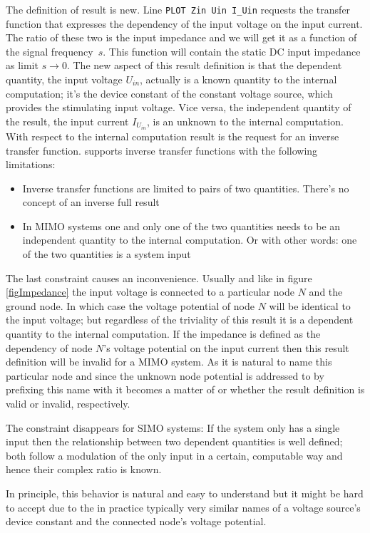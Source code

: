 The definition of result  is new. Line \verb+PLOT Zin Uin I_Uin+
requests the transfer function that expresses the dependency of the input
voltage on the input current. The ratio of these two is the input
impedance and we will get it as a function of the signal frequency~$s$. This
function will contain the static DC input impedance as limit $s \to 0$. The
new aspect of this result definition is that the dependent quantity, the
input voltage $U_{in}$, actually is a known quantity to the internal
computation; it's the device constant of the constant voltage source,
which provides the stimulating input voltage. Vice versa, the independent
quantity of the result, the input current $I_{U_{in}}$, is an unknown to the
internal computation. With respect to the internal computation result
 is the request for an inverse transfer function. \linnet{}
supports inverse transfer functions with the following limitations:
\begin{itemize}
  \item Inverse transfer functions are limited to pairs of two quantities.
    There's no concept of an inverse full result
  \item In MIMO systems one and only one of the two quantities needs to be
    an independent quantity to the internal computation. Or with other
    words: one of the two quantities is a system input
\end{itemize}
The last constraint causes an inconvenience. Usually and like in figure
\ref{figImpedance} the input voltage is connected to a particular node $N$
and the ground node. In which case the voltage potential of node $N$ will
be identical to the input voltage; but regardless of the triviality of
this result it is a dependent quantity to the internal computation. If the
impedance is defined as the dependency of node $N$'s voltage potential on
the input current then this result definition will be invalid for a MIMO
system. As it is natural to name this particular node  and since
the unknown node potential is addressed to by prefixing this name with
 it becomes a matter of  or  whether the
result definition is valid or invalid, respectively.

The constraint disappears for SIMO systems: If the system only has a
single input then the relationship between two dependent quantities is well
defined; both follow a modulation of the only input in a certain,
computable way and hence their complex ratio is known.

In principle, this behavior is natural and easy to understand but it might
be hard to accept due to the in practice typically very similar names of a
voltage source's device constant and the connected node's voltage
potential.

